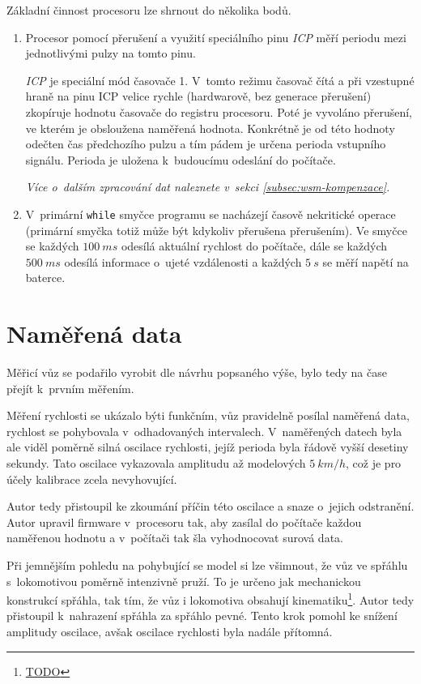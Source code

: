 Základní činnost procesoru lze shrnout do několika bodů.

\begin{enumerate}
\item Procesor pomocí přerušení a využití speciálního pinu \textit{ICP}
měří periodu mezi jednotlivými pulzy na tomto pinu.

\textit{ICP} je speciální mód časovače 1. V~tomto režimu časovač čítá a při
vzestupné hraně na pinu ICP velice rychle (hardwarově, bez generace přerušení)
zkopíruje hodnotu časovače do registru procesoru. Poté je vyvoláno přerušení,
ve kterém je obsloužena naměřená hodnota. Konkrétně je od této hodnoty odečten
čas předchozího pulzu a tím pádem je určena perioda vstupního signálu. Perioda
je uložena k~budoucímu odeslání do počítače.

\textit{Více o~dalším zpracování dat naleznete v~sekci
\ref{subsec:wsm-kompenzace}.}

\item V~primární \texttt{while} smyčce programu se nacházejí časově nekritické
operace (primární smyčka totiž může být kdykoliv přerušena přerušením). Ve
smyčce se každých $100\ ms$ odesílá aktuální rychlost do počítače, dále se každých
$500\ ms$ odesílá informace o~ujeté vzdálenosti a každých $5\ s$ se měří napětí
na baterce.

\end{enumerate}

\section{Naměřená data}
\label{sec:wsm-data}

Měřicí vůz se podařilo vyrobit dle návrhu popsaného výše, bylo tedy na čase
přejít k~prvním měřením.

Měření rychlosti se ukázalo býti funkčním, vůz pravidelně posílal naměřená
data, rychlost se pohybovala v~odhadovaných intervalech. V~naměřených datech
byla ale viděl poměrně silná oscilace rychlosti, jejíž perioda byla řádově
vyšší desetiny sekundy. Tato oscilace vykazovala amplitudu až modelových
$5\ km/h$, což je pro účely kalibrace zcela nevyhovující.

Autor tedy přistoupil ke zkoumání příčin této oscilace a snaze o~jejich
odstranění. Autor upravil firmware v~procesoru tak, aby zasílal do počítače
každou naměřenou hodnotu a v~počítači tak šla vyhodnocovat surová data.

Při jemnějším pohledu na pohybující se model si lze všimnout, že vůz ve spřáhlu
s~lokomotivou poměrně intenzivně pruží. To je určeno jak mechanickou konstrukcí
spřáhla, tak tím, že vůz i lokomotiva obsahují kinematiku\footnote{\url{TODO}}.
Autor tedy přistoupil k~nahrazení spřáhla za spřáhlo pevné. Tento krok pomohl
ke snížení amplitudy oscilace, avšak oscilace rychlosti byla nadále přítomná.

